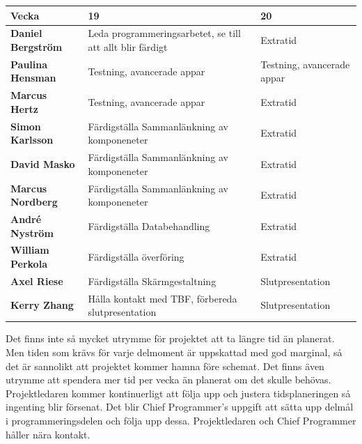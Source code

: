 \begin{tabular}{ | p{100pt} || p{110pt} | p{233pt} |}
  \hline
  \textbf{Vecka} & 19 & 20\\ \hline
  \textbf{Daniel Bergström} & Leda programmeringsarbetet, se till att allt blir färdigt & Extratid \\ \hline
  \textbf{Paulina Hensman} & Testning, avancerade appar & Testning, avancerade appar \\ \hline
  \textbf{Marcus Hertz} & Testning, avancerade appar & Extratid \\ \hline
  \textbf{Simon Karlsson} & Färdigställa Sammanlänkning av komponeneter & Extratid\\ \hline
  \textbf{David Masko} & Färdigställa Sammanlänkning av komponeneter & Extratid \\ \hline
  \textbf{Marcus Nordberg} & Färdigställa Sammanlänkning av komponeneter & Extratid \\ \hline
  \textbf{André Nyström} & Färdigställa Databehandling & Extratid \\ \hline
  \textbf{William Perkola} & Färdigställa överföring & Extratid\\ \hline
  \textbf{Axel Riese} & Färdigställa Skärmgestaltning & Slutpresentation \\ \hline
  \textbf{Kerry Zhang} & Hålla kontakt med TBF, förbereda slutpresentation  & Slutpresentation \\ \hline
\end{tabular}



Det finns inte så mycket utrymme för projektet att ta längre tid än planerat. Men tiden som krävs för varje delmoment är uppskattad med god marginal, så det är sannolikt att projektet kommer hamna före schemat. Det finns även utrymme att spendera mer tid per vecka än planerat om det skulle behövas. Projektledaren kommer kontinuerligt att följa upp och justera tidsplaneringen så ingenting blir försenat. Det blir Chief Programmer’s uppgift att sätta upp delmål i programmeringsdelen och följa upp dessa. Projektledaren och Chief Programmer håller nära kontakt.
